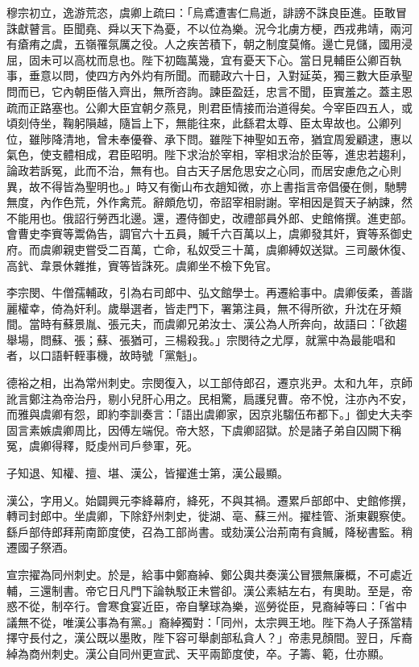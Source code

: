 \begin{pinyinscope}
 穆宗初立，逸游荒恣，虞卿上疏曰：「烏鳶遭害仁鳥逝，誹謗不誅良臣進。臣敢冒誅獻瞽言。臣聞堯、舜以天下為憂，不以位為樂。況今北虜方梗，西戎弗靖，兩河有瘡痏之虞，五嶺罹氛厲之役。人之疾苦積下，朝之制度莫脩。邊亡見儲，國用浸屈，固未可以高枕而息也。陛下初臨萬幾，宜有憂天下心。當日見輔臣公卿百執事，垂意以問，使四方內外灼有所聞。而聽政六十日，入對延英，獨三數大臣承聖問而已，它內朝臣偕入齊出，無所咨詢。諫臣盈廷，忠言不聞，臣實羞之。蓋主恩疏而正路塞也。公卿大臣宜朝夕燕見，則君臣情接而治道得矣。今宰臣四五人，或頃刻侍坐，鞠躬隕越，隨旨上下，無能往來，此繇君太尊、臣太卑故也。公卿列位，雖陟降清地，曾未奉優眷、承下問。雖陛下神聖如五帝，猶宜周爰顧逮，惠以氣色，使支體相成，君臣昭明。陛下求治於宰相，宰相求治於臣等，進忠若趨利，論政若訴冤，此而不治，無有也。自古天子居危思安之心同，而居安慮危之心則異，故不得皆為聖明也。」時又有衡山布衣趙知微，亦上書指言帝倡優在側，馳騁無度，內作色荒，外作禽荒。辭頗危切，帝詔宰相尉謝。宰相因是賀天子納諫，然不能用也。俄詔行勞西北邊。還，遷侍御史，改禮部員外郎、史館脩撰。進吏部。會曹史李賨等鬻偽告，調官六十五員，贓千六百萬以上，虞卿發其奸，賨等系御史府。而虞卿親吏嘗受二百萬，亡命，私奴受三十萬，虞卿縛奴送獄。三司嚴休復、高釴、韋景休雜推，賨等皆誅死。虞卿坐不檢下免官。



 李宗閔、牛僧孺輔政，引為右司郎中、弘文館學士。再遷給事中。虞卿佞柔，善諧麗權幸，倚為奸利。歲舉選者，皆走門下，署第注員，無不得所欲，升沈在牙頰間。當時有蘇景胤、張元夫，而虞卿兄弟汝士、漢公為人所奔向，故語曰：「欲趨舉場，問蘇、張；蘇、張猶可，三楊殺我。」宗閔待之尤厚，就黨中為最能唱和者，以口語軒輊事機，故時號「黨魁」。



 德裕之相，出為常州刺史。宗閔復入，以工部侍郎召，遷京兆尹。太和九年，京師訛言鄭注為帝治丹，剔小兒肝心用之。民相驚，扃護兒曹。帝不悅，注亦內不安，而雅與虞卿有怨，即約李訓奏言：「語出虞卿家，因京兆騶伍布都下。」御史大夫李固言素嫉虞卿周比，因傅左端倪。帝大怒，下虞卿詔獄。於是諸子弟自囚闕下稱冤，虞卿得釋，貶虔州司戶參軍，死。



 子知退、知權、擅、堪、漢公，皆擢進士第，漢公最顯。



 漢公，字用乂。始闢興元李絳幕府，絳死，不與其禍。遷累戶部郎中、史館修撰，轉司封郎中。坐虞卿，下除舒州刺史，徙湖、亳、蘇三州。擢桂管、浙東觀察使。繇戶部侍郎拜荊南節度使，召為工部尚書。或劾漢公治荊南有貪贓，降秘書監。稍遷國子祭酒。



 宣宗擢為同州刺史。於是，給事中鄭裔綽、鄭公輿共奏漢公冒猥無廉概，不可處近輔，三還制書。帝它日凡門下論執駁正未嘗卻。漢公素結左右，有奧助。至是，帝惑不從，制卒行。會寒食宴近臣，帝自擊球為樂，巡勞從臣，見裔綽等曰：「省中議無不從，唯漢公事為有黨。」裔綽獨對：「同州，太宗興王地。陛下為人子孫當精擇守長付之，漢公既以墨敗，陛下容可舉劇部私貪人？」帝恚見顏間。翌日，斥裔綽為商州刺史。漢公自同州更宣武、天平兩節度使，卒。子籌、範，仕亦顯。




\end{pinyinscope}
